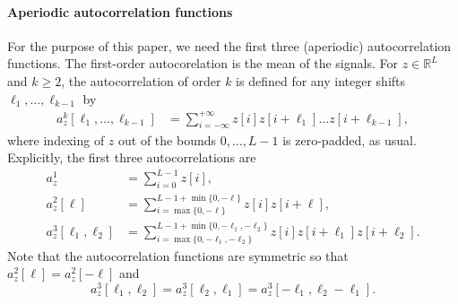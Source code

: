 \documentclass[english,11pt]{article}
\numberwithin{equation}{section}
\theoremstyle{plain}
\theoremstyle{definition}
\theoremstyle{remark}
\theoremstyle{plain}
\theoremstyle{remark}
\theoremstyle{plain}
\theoremstyle{plain}
\newcommand{\RL}{\mathbb{R}^L}
\newcommand{\SNR}{{\textsf{SNR}}}
\begin{document}
%
%

\paragraph{Aperiodic autocorrelation functions}

For the purpose of this paper, we need the first three (aperiodic) autocorrelation functions. The first-order autocorelation is the mean of the signals. For  
$z\in\RL$ and $k\geq 2$, the autocorrelation of order $k$ is defined for any integer shifts $\ell_1, \ldots, \ell_{k-1}$ by
\begin{align}
	a_z^k[\ell_1,\ldots,\ell_{k-1}]  & = \sum_{i=-\infty}^{+\infty} z[i]z[i+\ell_1]\ldots z[i+\ell_{k-1}],
	\label{eq:ac_general}
\end{align}
where indexing of $z$ out of the bounds $0, \ldots, L-1$ is zero-padded, as usual.
Explicitly, the first three autocorrelations are
\begin{align} 
	a_z^1 & = \sum_{i=0}^{L-1} z[i], \nonumber\\
	a_z^2[\ell] & = \sum_{i = \max\{0, -\ell\}}^{L-1 + \min\{0, -\ell\}} z[i]z[i+\ell], \nonumber\\
	a_z^3[\ell_1,\ell_2] & = \sum_{i = \max\{0, -\ell_1, -\ell_2\}}^{L-1 + \min\{0, -\ell_1, -\ell_2\}} z[i]z[i+\ell_1]z[i+\ell_2]. \label{eq:ac_special}
\end{align}
Note that the autocorrelation functions are symmetric so that $a_z^2[\ell] = a_z^2[-\ell]$ and $$a_z^3[\ell_1,\ell_2] = a_z^3[\ell_2,\ell_1]=a_z^3[-\ell_1,\ell_2-\ell_1].$$
\end{document}
